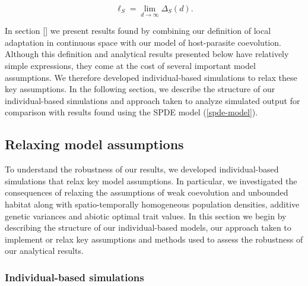 \documentclass{article}
\begin{document}
\begin{equation}\label{la-cont-sp}
  \ell_S=\lim_{d\to\infty}\Delta_S(d).
\end{equation}

In section \ref{} we present results found by combining our definition
of local adaptation in continuous space with our model of host-parasite
coevolution. Although this definition and analytical results presented
below have relatively simple expressions, they come at the cost of
several important model assumptions. We therefore developed
individual-based simulations to relax these key assumptions. In the
following section, we describe the structure of our individual-based
simulations and approach taken to analyze simulated output for
comparison with results found using the SPDE model (\ref{spde-model}).

\hypertarget{relaxing-model-assumptions}{%
\subsection{\texorpdfstring{Relaxing model assumptions
\label{ibs}}{Relaxing model assumptions }}\label{relaxing-model-assumptions}}

To understand the robustness of our results, we developed
individual-based simulations that relax key model assumptions. In
particular, we investigated the consequences of relaxing the assumptions
of weak coevolution and unbounded habitat along with spatio-temporally
homogeneous population densities, additive genetic variances and abiotic
optimal trait values. In this section we begin by describing the
structure of our individual-based models, our approach taken to
implement or relax key assumptions and methods used to assess the
robustness of our analytical results.

\hypertarget{individual-based-simulations}{%
\subsubsection{Individual-based
simulations}\label{individual-based-simulations}}
\end{document}
